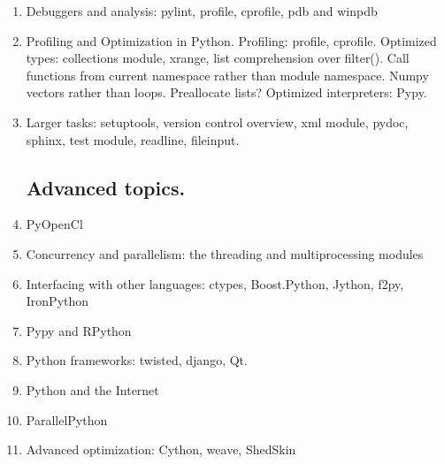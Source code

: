 \begin{enumerate}
    \item Debuggers and analysis: pylint, profile, cprofile, pdb and winpdb

    \item Profiling and Optimization in Python. Profiling: profile, cprofile. Optimized types: collections module, xrange, list comprehension over filter(). Call functions from current namespace rather than module namespace. Numpy vectors rather than loops. Preallocate lists? Optimized interpreters: Pypy.

    \item Larger tasks: setuptools, version control overview, xml module, pydoc, sphinx, test module, readline, fileinput.

\subsection{Advanced topics.}
    \item PyOpenCl

    \item Concurrency and parallelism: the threading and multiprocessing modules

    \item Interfacing with other languages: ctypes, Boost.Python, Jython, f2py, IronPython

    \item Pypy and RPython

    \item Python frameworks: twisted, django, Qt.

    \item Python and the Internet

    \item ParallelPython

    \item Advanced optimization: Cython, weave, ShedSkin

\end{enumerate}